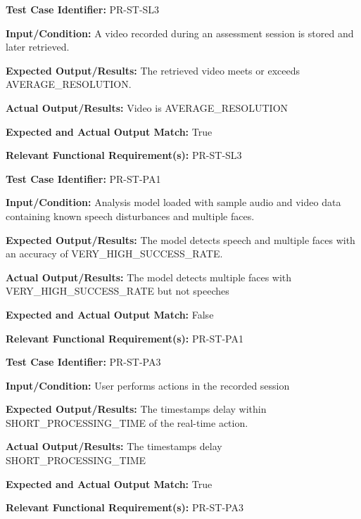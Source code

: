 \documentclass[12pt, titlepage]{article}
\begin{document}
\begin{mdframed}[linewidth=0.5mm]
  \textbf{Test Case Identifier:} PR-ST-SL3 \par
  \textbf{Input/Condition:} A video recorded during an assessment session is stored and later retrieved. \par
  \textbf{Expected Output/Results:} The retrieved video meets or exceeds AVERAGE\_RESOLUTION. \par
  \textbf{Actual Output/Results:} Video is AVERAGE\_RESOLUTION\par
  \textbf{Expected and Actual Output Match:} True \par
  \textbf{Relevant Functional Requirement(s):} PR-ST-SL3
\end{mdframed}

\begin{mdframed}[linewidth=0.5mm]
  \textbf{Test Case Identifier:} PR-ST-PA1\par
  \textbf{Input/Condition:} Analysis model loaded with sample audio and video data containing known speech disturbances and multiple faces. \par
  \textbf{Expected Output/Results:} The model detects speech and multiple faces with an accuracy of VERY\_HIGH\_SUCCESS\_RATE. \par
  \textbf{Actual Output/Results:} The model detects multiple faces with \\VERY\_HIGH\_SUCCESS\_RATE but not speeches \par
  \textbf{Expected and Actual Output Match:} False \par
  \textbf{Relevant Functional Requirement(s):} PR-ST-PA1
\end{mdframed}

\begin{mdframed}[linewidth=0.5mm]
  \textbf{Test Case Identifier:} PR-ST-PA3 \par
  \textbf{Input/Condition:} User performs actions in the recorded session \par
  \textbf{Expected Output/Results:} The timestamps delay within \\SHORT\_PROCESSING\_TIME of the real-time action. \par
  \textbf{Actual Output/Results:} The timestamps delay \\SHORT\_PROCESSING\_TIME  \par
  \textbf{Expected and Actual Output Match:} True \par
  \textbf{Relevant Functional Requirement(s):} PR-ST-PA3
\end{mdframed}
\end{document}
